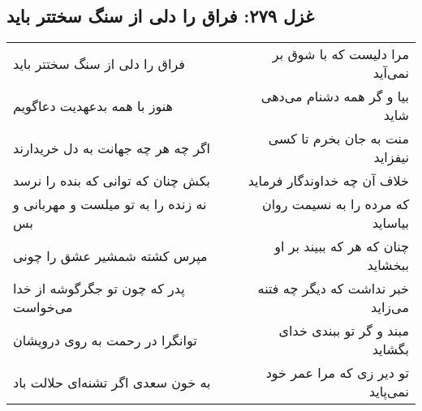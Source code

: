 \begin{center}
\section*{غزل ۲۷۹: فراق را دلی از سنگ سختتر باید}
\label{sec:279}
\begin{longtable}{l p{0.5cm} r}
فراق را دلی از سنگ سختتر باید
&&
مرا دلیست که با شوق بر نمی‌آید
\\
هنوز با همه بدعهدیت دعاگویم
&&
بیا و گر همه دشنام می‌دهی شاید
\\
اگر چه هر چه جهانت به دل خریدارند
&&
منت به جان بخرم تا کسی نیفزاید
\\
بکش چنان که توانی که بنده را نرسد
&&
خلاف آن چه خداوندگار فرماید
\\
نه زنده را به تو میلست و مهربانی و بس
&&
که مرده را به نسیمت روان بیاساید
\\
مپرس کشته شمشیر عشق را چونی
&&
چنان که هر که ببیند بر او ببخشاید
\\
پدر که چون تو جگرگوشه از خدا می‌خواست
&&
خبر نداشت که دیگر چه فتنه می‌زاید
\\
توانگرا در رحمت به روی درویشان
&&
مبند و گر تو ببندی خدای بگشاید
\\
به خون سعدی اگر تشنه‌ای حلالت باد
&&
تو دیر زی که مرا عمر خود نمی‌پاید
\\
\end{longtable}
\end{center}
